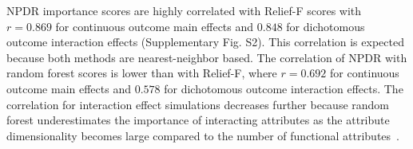 \documentclass{bioinfo}
\begin{document}
NPDR importance scores are highly correlated with Relief-F scores with $r = 0.869$ for continuous outcome main effects and $0.848$ for dichotomous outcome interaction effects (Supplementary Fig. S2).
This correlation is expected because both methods are nearest-neighbor based.
The correlation of NPDR with random forest scores is lower than with Relief-F, where $r = 0.692$ for continuous outcome main effects and $0.578$ for dichotomous outcome interaction effects.
The correlation for interaction effect simulations decreases further because random forest underestimates the importance of interacting attributes as the attribute dimensionality becomes large compared to the number of functional attributes~\citep{mckinney2009capturing,winham2012snp}.

% 
% 
\end{document}
